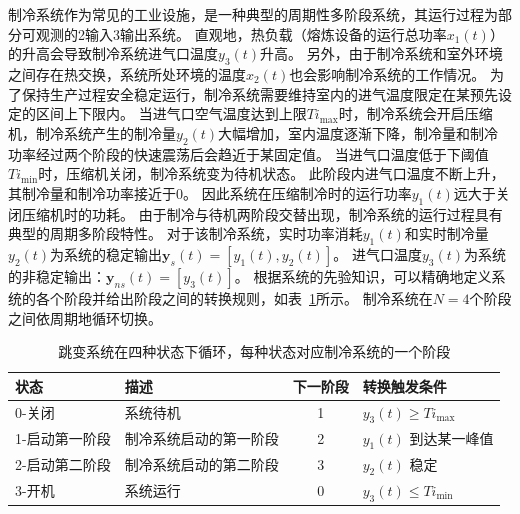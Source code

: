 制冷系统作为常见的工业设施，是一种典型的周期性多阶段系统，其运行过程为部分可观测的2输入3输出系统。
直观地，热负载（熔炼设备的运行总功率$x_1(t)$）的升高会导致制冷系统进气口温度$y_3(t)$升高。
另外，由于制冷系统和室外环境之间存在热交换，系统所处环境的温度$x_2(t)$也会影响制冷系统的工作情况。
为了保持生产过程安全稳定运行，制冷系统需要维持室内的进气温度限定在某预先设定的区间上下限内。
当进气口空气温度达到上限$Ti_{\max}$时，制冷系统会开启压缩机，制冷系统产生的制冷量$y_2(t)$大幅增加，室内温度逐渐下降，制冷量和制冷功率经过两个阶段的快速震荡后会趋近于某固定值。
当进气口温度低于下阈值$Ti_{\min}$时，压缩机关闭，制冷系统变为待机状态。
此阶段内进气口温度不断上升，其制冷量和制冷功率接近于0。
因此系统在压缩制冷时的运行功率$y_1(t)$远大于关闭压缩机时的功耗。
由于制冷与待机两阶段交替出现，制冷系统的运行过程具有典型的周期多阶段特性。
对于该制冷系统，实时功率消耗$y_1(t)$和实时制冷量$y_2(t)$为系统的稳定输出$\boldsymbol y_s(t)=[y_1(t), y_2(t)]$。
进气口温度$y_3(t)$为系统的非稳定输出：$\boldsymbol y_{ns}(t)=[y_3(t)]$。
根据系统的先验知识，可以精确地定义系统的各个阶段并给出阶段之间的转换规则，如表~\ref{tab:cooling_dfa}所示。
制冷系统在$N=4$个阶段之间依周期地循环切换。
\begin{table}[]
    \centering
    \caption{跳变系统在四种状态下循环，每种状态对应制冷系统的一个阶段}
    \label{tab:cooling_dfa}
    \begin{tabular}{llcl}
    \toprule
       状态                  &    描述             & 下一阶段 & 转换触发条件                                   \\ 
       \hline
    0-关闭                       & 系统待机                             & 1          & $y_3(t)\geq Ti_{\max}$                                \\
    1-启动第一阶段                      & 制冷系统启动的第一阶段                     & 2          & $y_1(t)$ 到达某一峰值                            \\
    2-启动第二阶段                       & 制冷系统启动的第二阶段 & 3          & \multicolumn{1}{l}{$y_2(t)$ 稳定} \\
    3-开机                       & 系统运行                                   & 0          & $y_3(t)\leq Ti_{\min}$                                \\
    \bottomrule
    \end{tabular}
\end{table}

